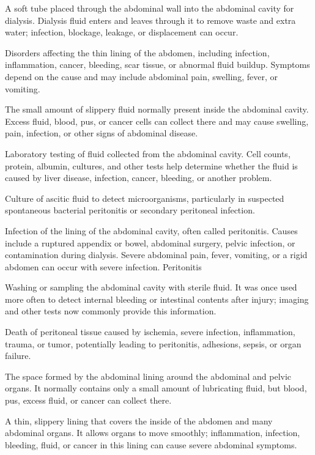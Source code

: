  A soft tube placed through the abdominal wall into the abdominal cavity for dialysis. Dialysis fluid enters and leaves through it to remove waste and extra water; infection, blockage, leakage, or displacement can occur.

 Disorders affecting the thin lining of the abdomen, including infection, inflammation, cancer, bleeding, scar tissue, or abnormal fluid buildup. Symptoms depend on the cause and may include abdominal pain, swelling, fever, or vomiting.

 The small amount of slippery fluid normally present inside the abdominal cavity. Excess fluid, blood, pus, or cancer cells can collect there and may cause swelling, pain, infection, or other signs of abdominal disease.

 Laboratory testing of fluid collected from the abdominal cavity. Cell counts, protein, albumin, cultures, and other tests help determine whether the fluid is caused by liver disease, infection, cancer, bleeding, or another problem.

 Culture of ascitic fluid to detect microorganisms, particularly in suspected spontaneous bacterial peritonitis or secondary peritoneal infection.

 Infection of the lining of the abdominal cavity, often called peritonitis. Causes include a ruptured
appendix or bowel, abdominal surgery, pelvic infection, or contamination during dialysis.
Severe abdominal pain, fever, vomiting, or a rigid abdomen can occur with severe infection.
\synonyms
Peritonitis

 Washing or sampling the abdominal cavity with sterile fluid. It was once used more often to detect internal bleeding or intestinal contents after injury; imaging and other tests now commonly provide this information.

 Death of peritoneal tissue caused by ischemia, severe infection, inflammation, trauma, or tumor, potentially leading to peritonitis, adhesions, sepsis, or organ failure.

 The space formed by the abdominal lining around the abdominal and pelvic organs. It normally contains only a small amount of lubricating fluid, but blood, pus, excess fluid, or cancer can collect there.

 A thin, slippery lining that covers the inside of the abdomen and many abdominal organs. It allows organs to move smoothly; inflammation, infection, bleeding, fluid, or cancer in this lining can cause severe abdominal symptoms.

